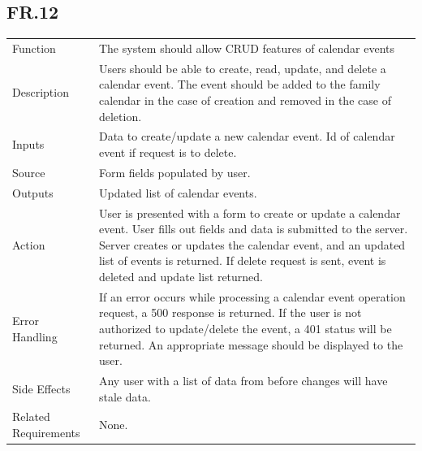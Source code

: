 \documentclass[12pt]{article}
\begin{document}
    \subsection*{FR.12}
    \begin{center}
        \begin{tabular}{| p{10em} p{26em} |}
        \hline
         Function & The system should allow CRUD features of calendar events\\
         Description & Users should be able to create, read, update, and delete a calendar event. The event should be added to the family calendar in the case of creation and removed in the case of deletion.\\
         Inputs & Data to create/update a new calendar event. Id of calendar event if request is to delete.\\
         Source & Form fields populated by user.\\
         Outputs & Updated list of calendar events.\\
         Action & User is presented with a form to create or update a calendar event. User fills out fields and data is submitted to the server. Server creates or updates the calendar event, and an updated list of events is returned. If delete request is sent, event is deleted and update list returned.\\
         Error Handling & If an error occurs while processing a calendar event operation request, a 500 response is returned. If the user is not authorized to update/delete the event, a 401 status will be returned. An appropriate message should be displayed to the user.\\
         Side Effects & Any user with a list of data from before changes will have stale data.\\
         Related Requirements & None.\\
         \hline
        \end{tabular}
    \end{center}
\end{document}
